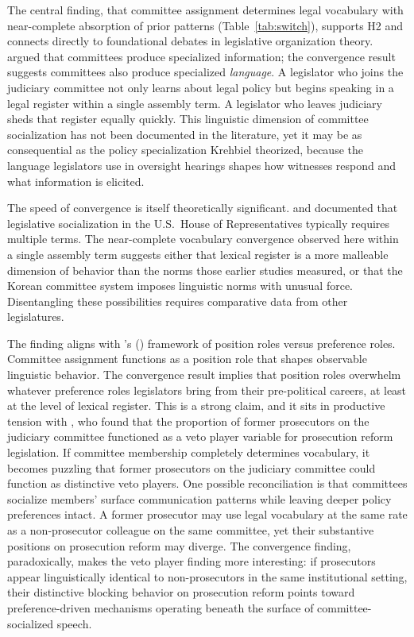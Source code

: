 \documentclass[11pt]{article}
\begin{document}
The central finding, that committee assignment determines legal vocabulary with near-complete absorption of prior patterns (Table~\ref{tab:switch}), supports H2 and connects directly to foundational debates in legislative organization theory. \citet{krehbiel1991} argued that committees produce specialized information; the convergence result suggests committees also produce specialized \textit{language}. A legislator who joins the judiciary committee not only learns about legal policy but begins speaking in a legal register within a single assembly term. A legislator who leaves judiciary sheds that register equally quickly. This linguistic dimension of committee socialization has not been documented in the literature, yet it may be as consequential as the policy specialization Krehbiel theorized, because the language legislators use in oversight hearings shapes how witnesses respond and what information is elicited.

The speed of convergence is itself theoretically significant. \citet{asher1973} and \citet{crook1985} documented that legislative socialization in the U.S.\ House of Representatives typically requires multiple terms. The near-complete vocabulary convergence observed here within a single assembly term suggests either that lexical register is a more malleable dimension of behavior than the norms those earlier studies measured, or that the Korean committee system imposes linguistic norms with unusual force. Disentangling these possibilities requires comparative data from other legislatures.

The finding aligns with \citeauthor{searing1994}'s (\citeyear{searing1994}) framework of position roles versus preference roles. Committee assignment functions as a position role that shapes observable linguistic behavior. The convergence result implies that position roles overwhelm whatever preference roles legislators bring from their pre-political careers, at least at the level of lexical register. This is a strong claim, and it sits in productive tension with \citet{park2025}, who found that the proportion of former prosecutors on the judiciary committee functioned as a veto player variable for prosecution reform legislation. If committee membership completely determines vocabulary, it becomes puzzling that former prosecutors on the judiciary committee could function as distinctive veto players. One possible reconciliation is that committees socialize members' surface communication patterns while leaving deeper policy preferences intact. A former prosecutor may use legal vocabulary at the same rate as a non-prosecutor colleague on the same committee, yet their substantive positions on prosecution reform may diverge. The convergence finding, paradoxically, makes the veto player finding more interesting: if prosecutors appear linguistically identical to non-prosecutors in the same institutional setting, their distinctive blocking behavior on prosecution reform points toward preference-driven mechanisms operating beneath the surface of committee-socialized speech.
\end{document}
